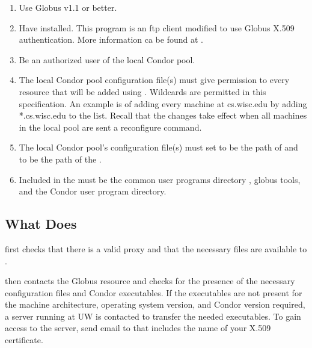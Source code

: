 \begin{enumerate}
\item Use Globus v1.1 or better.

\item Have  installed. This program is an ftp
  client modified to use Globus X.509 authentication.
  More information ca be found at
  .

\item Be an authorized user of the local Condor pool.

\item The local Condor pool configuration file(s) must 
  give  permission
  to every resource that will be added using . 
  Wildcards are permitted in this specification.
  An example is of adding every machine at
  cs.wisc.edu by adding *.cs.wisc.edu to the
   list.
  Recall that the changes take effect when all machines
  in the local pool are sent a reconfigure command.

\item The local Condor pool's configuration file(s) must
  set  to be the path of 
  and  to be the path of the .

\item Included in the  must be the common user programs
  directory , globus tools, and the Condor user program
  directory.

\end{enumerate}

\subsection{What  Does}

 first checks that there is a valid proxy
and that the necessary files are available to .

 then contacts the Globus resource and checks for the
presence of the necessary configuration files and Condor executables.
If the executables are not present for the machine architecture,
operating system version, and Condor version required, a
server running at UW is contacted to transfer the needed executables.
To gain access to the server, send email to 
that includes the name of your X.509 certificate.

